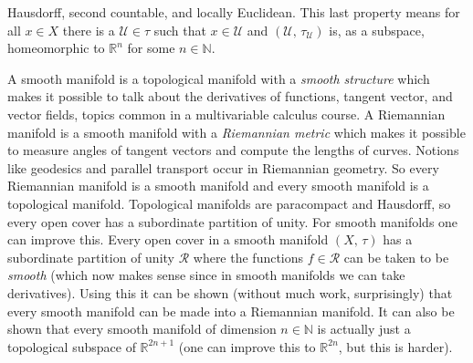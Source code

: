 \documentclass{article}
\theoremstyle{plain}
\theoremstyle{normal}
\begin{document}
        Hausdorff, second countable, and locally Euclidean. This last property
        means for all $x\in{X}$ there is a $\mathcal{U}\in\tau$ such that
        $x\in\mathcal{U}$ and $(\mathcal{U},\,\tau_{\mathcal{U}})$ is, as a
        subspace, homeomorphic to $\mathbb{R}^{n}$ for some $n\in\mathbb{N}$.
        \par\hfill\par
        A smooth manifold is a topological manifold with a
        \textit{smooth structure} which makes it possible to talk about the
        derivatives of functions, tangent vector, and vector fields, topics
        common in a multivariable calculus course. A Riemannian manifold is a
        smooth manifold with a \textit{Riemannian metric} which makes it
        possible to measure angles of tangent vectors and compute the lengths
        of curves. Notions like geodesics and parallel transport occur in
        Riemannian geometry. So every Riemannian manifold is a smooth manifold
        and every smooth manifold is a topological manifold. Topological
        manifolds are paracompact and Hausdorff, so every open cover has a
        subordinate partition of unity. For smooth manifolds one can improve
        this. Every open cover in a smooth manifold $(X,\,\tau)$ has a
        subordinate partition of unity $\mathcal{R}$ where the functions
        $f\in\mathcal{R}$ can be taken to be \textit{smooth}
        (which now makes sense since in smooth manifolds we can take
        derivatives). Using this it can be shown (without much work,
        surprisingly) that every smooth manifold can be made into a Riemannian
        manifold. It can also be shown that every smooth manifold of dimension
        $n\in\mathbb{N}$ is actually just a topological subspace of
        $\mathbb{R}^{2n+1}$ (one can improve this to $\mathbb{R}^{2n}$, but
        this is harder).
\end{document}
